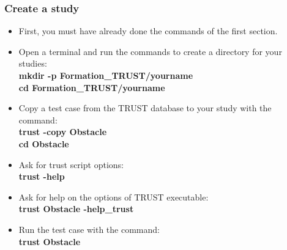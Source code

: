 \documentclass[10pt, hyperref={unicode=true,pdfusetitle, bookmarks=true,bookmarksnumbered=false,bookmarksopen=false, breaklinks=false,pdfborder={0 0 1},backref=true,colorlinks=true,linkcolor=darkblue,pageanchor}]{beamer}
\begin{document}
\begin{frame}
\frametitle{Create a study}
\begin{block}{}

\begin{itemize}
\item First, you must have already done the commands of the first section.
\vspace{0.2cm}

\item Open a terminal and run the commands to create a directory for your studies: \\
\textbf{mkdir -p \; Formation\_TRUST/yourname}\\
\textbf{cd \; Formation\_TRUST/yourname}
\vspace{0.2cm}

\item \label{method_copy} Copy a test case from the TRUST database to your study with the command:\\
\textbf{trust -copy Obstacle}\\
\textbf{cd Obstacle}
\vspace{0.2cm}

\item Ask for trust script options:\\
\textbf{trust -help}\\
\vspace{0.2cm}

\item Ask for help on the options of TRUST executable:\\
\textbf{trust Obstacle -help\_trust}\\
\vspace{0.2cm}

\item Run the test case with the command:\\
\textbf{trust Obstacle}\\

\end{itemize}

\end{block}
\end{frame}
\end{document}
